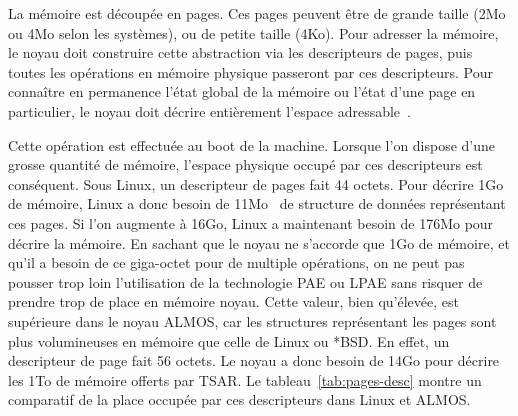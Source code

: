       La mémoire est découpée en pages. Ces pages peuvent être de grande taille
      (2Mo ou 4Mo selon les systèmes), ou de petite taille (4Ko). Pour adresser
      la mémoire, le noyau doit construire cette abstraction via les
      descripteurs de pages, puis toutes les opérations en mémoire physique
      passeront par ces descripteurs. Pour connaître en permanence l'état global
      de la mémoire ou l'état d'une page en particulier, le noyau doit décrire
      entièrement l'espace adressable~\citep{cranor1999uvm,
        gorman2004understanding, russinovich2012windows, dillon2000design,
        steldt2009memory, steldtXXXXopenbsd}.

      Cette opération est effectuée au boot de la machine. Lorsque l’on dispose
      d’une grosse quantité de mémoire, l'espace physique occupé par ces
      descripteurs est conséquent. Sous Linux, un descripteur de pages fait 44
      octets. Pour décrire 1Go de mémoire, Linux a donc besoin de
      11Mo~\citep{gorman2004understanding} de structure de données représentant
      ces pages. Si l'on augmente à 16Go, Linux a maintenant besoin de 176Mo
      pour décrire la mémoire. En sachant que le noyau ne s'accorde que 1Go de
      mémoire, et qu'il a besoin de ce giga-octet pour de multiple opérations,
      on ne peut pas pousser trop loin l'utilisation de la technologie PAE ou
      LPAE sans risquer de prendre trop de place en mémoire noyau. Cette valeur,
      bien qu’élevée, est supérieure dans le noyau ALMOS, car les structures
      représentant les pages sont plus volumineuses en mémoire que celle de
      Linux ou *BSD. En effet, un descripteur de page fait 56 octets. Le noyau a
      donc besoin de 14Go pour décrire les 1To de mémoire offerts par TSAR. Le
      tableau~\ref{tab:pages-desc} montre un comparatif de la place occupée par
      ces descripteurs dans Linux et ALMOS.

